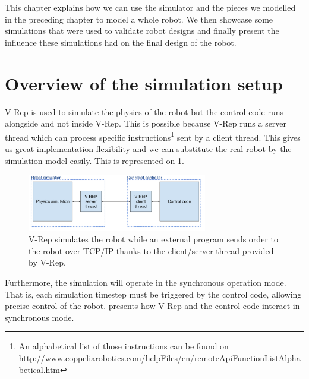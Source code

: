 This chapter explains how we can use the simulator and the pieces we modelled in the preceding chapter to model a whole robot. We then showcase some simulations that were used to validate robot designs and finally present the influence these simulations had on the final design of the robot. 

\section{Overview of the simulation setup}
V-Rep is used to simulate the physics of the robot but the control code runs alongside and not inside V-Rep. This is possible because V-Rep runs a server thread which can process specific instructions\footnote{An alphabetical list of those instructions can be found on \url{http://www.coppeliarobotics.com/helpFiles/en/remoteApiFunctionListAlphabetical.htm}} sent by a client thread. This gives us great implementation flexibility and we can substitute the real robot by the simulation model easily. This is represented on \cref{fig:simulation_principles}.

\begin{figure}[htp]
\center
\includegraphics[width=0.7\textwidth]{figures/simulation_principles}
\caption[Simulation principles]{V-Rep simulates the robot while an external program sends order to the robot over TCP/IP thanks to the client/server thread provided by V-Rep.}
\label{fig:simulation_principles}
\end{figure}

Furthermore, the simulation will operate in the synchronous operation mode. That is, each simulation timestep must be triggered by the control code, allowing precise control of the robot.  presents how V-Rep and the control code interact in synchronous mode.

